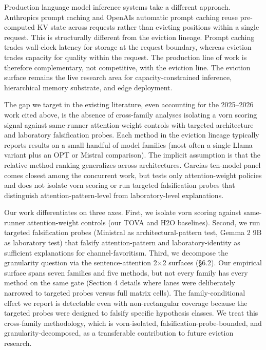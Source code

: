 \documentclass[10pt]{article}
\begin{document}
Production language model inference systems take a different approach.
Anthropic\textquotesingle s prompt caching \citep{anthropic2024promptcaching} and
OpenAI\textquotesingle s automatic prompt caching \citep{openai2024promptcaching} reuse
pre-computed KV state across requests rather than evicting positions
within a single request. This is structurally different from the
eviction lineage. Prompt caching trades wall-clock latency for storage
at the request boundary, whereas eviction trades capacity for quality
within the request. The production line of work is therefore
complementary, not competitive, with the eviction line. The eviction
surface remains the live research area for capacity-constrained
inference, hierarchical memory substrate, and edge deployment.

The gap we target in the existing literature, even accounting for the
2025--2026 work cited above, is the absence of cross-family analyses
isolating a vorn scoring signal against same-runner
attention-weight controls with targeted architecture and laboratory
falsification probes. Each method in the eviction lineage typically
reports results on a small handful of model families (most often a
single Llama variant plus an OPT or Mistral comparison). The implicit
assumption is that the relative method ranking generalizes across
architectures. Garcia\textquotesingle s ten-model panel comes closest
among the concurrent work, but tests only attention-weight policies and
does not isolate vorn scoring or run targeted
falsification probes that distinguish attention-pattern-level from
laboratory-level explanations.

Our work differentiates on three axes. First, we isolate
vorn scoring against same-runner attention-weight controls
(our TOVA and H2O baselines). Second, we run targeted
falsification probes (Ministral as architectural-pattern test, Gemma
2 9B as laboratory test) that falsify attention-pattern and
laboratory-identity as sufficient explanations for channel-favoritism. Third, we decompose the granularity question via the
sentence-attention 2$\times$2 surfaces (\S{}6.2). Our empirical surface spans seven
families and five methods, but not every family has every method on the
same gate (Section 4 details where lanes were deliberately narrowed to
targeted probes versus full matrix cells). The family-conditional effect
we report is detectable even with non-rectangular coverage because the
targeted probes were designed to falsify specific hypothesis classes. We
treat this cross-family methodology, which is
vorn-isolated, falsification-probe-bounded, and
granularity-decomposed, as a transferable contribution to future
eviction research.
\end{document}
